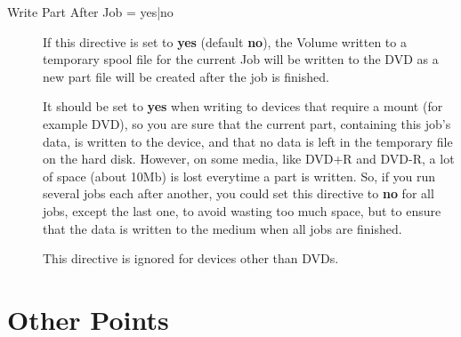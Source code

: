 \label{WritePartAfterJob}
\begin{description}
\item [Write Part After Job = \lt{}yes|no\gt{}]
   If this directive is set to {\bf yes} (default {\bf no}), the
   Volume written to a temporary spool file for the current Job will
   be written to the DVD as a new part file
   will be created after the job is finished.  

   It should be set to {\bf yes} when writing to devices that require a mount
   (for example DVD), so you are sure that the current part, containing
   this job's data, is written to the device, and that no data is left in
   the temporary file on the hard disk.  However, on some media, like DVD+R
   and DVD-R, a lot of space (about 10Mb) is lost everytime a part is
   written.  So, if you run several jobs each after another, you could set
   this directive to {\bf no} for all jobs, except the last one, to avoid
   wasting too much space, but to ensure that the data is written to the
   medium when all jobs are finished.

   This directive is ignored for devices other than DVDs.
\end{description}



\label{DVDpoints}
\section{Other Points}


